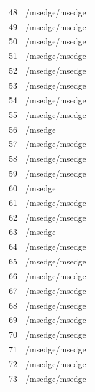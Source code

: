 \documentclass[a4paper,twoside,12pt]{book}
\begin{document}
\begin{appendices}
\begin{table}
\begin{tabular}{ll}
		48  &                                     /msedge/msedge \\
		49  &                                     /msedge/msedge \\
		50  &                                     /msedge/msedge \\
		51  &                                     /msedge/msedge \\
		52  &                                     /msedge/msedge \\
		53  &                                     /msedge/msedge \\
		54  &                                     /msedge/msedge \\
		55  &                                     /msedge/msedge \\
		56  &                                            /msedge \\
		57  &                                     /msedge/msedge \\
		58  &                                     /msedge/msedge \\
		59  &                                     /msedge/msedge \\
		60  &                                            /msedge \\
		61  &                                     /msedge/msedge \\
		62  &                                     /msedge/msedge \\
		63  &                                            /msedge \\
		64  &                                     /msedge/msedge \\
		65  &                                     /msedge/msedge \\
		66  &                                     /msedge/msedge \\
		67  &                                     /msedge/msedge \\
		68  &                                     /msedge/msedge \\
		69  &                                     /msedge/msedge \\
		70  &                                     /msedge/msedge \\
		71  &                                     /msedge/msedge \\
		72  &                                     /msedge/msedge \\
		73  &                                     /msedge/msedge \\

\end{tabular}
\end{table}
\end{appendices}
\end{document}
